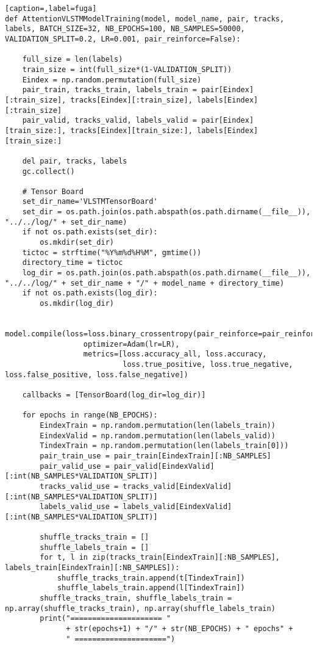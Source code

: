 \begin{lstlisting}[caption=,label=fuga]
def AttentionVLSTMModelTraining(model, model_name, pair, tracks, labels, BATCH_SIZE=32, NB_EPOCHS=100, NB_SAMPLES=50000, VALIDATION_SPLIT=0.2, LR=0.001, pair_reinforce=False):

    full_size = len(labels)
    train_size = int(full_size*(1-VALIDATION_SPLIT))
    Eindex = np.random.permutation(full_size)
    pair_train, tracks_train, labels_train = pair[Eindex][:train_size], tracks[Eindex][:train_size], labels[Eindex][:train_size]
    pair_valid, tracks_valid, labels_valid = pair[Eindex][train_size:], tracks[Eindex][train_size:], labels[Eindex][train_size:]

    del pair, tracks, labels
    gc.collect()

    # Tensor Board
    set_dir_name='VLSTMTensorBoard'
    set_dir = os.path.join(os.path.abspath(os.path.dirname(__file__)), "../../log/" + set_dir_name)
    if not os.path.exists(set_dir):
        os.mkdir(set_dir)
    tictoc = strftime("%Y%m%d%H%M", gmtime())
    directory_time = tictoc
    log_dir = os.path.join(os.path.abspath(os.path.dirname(__file__)), "../../log/" + set_dir_name + "/" + model_name + directory_time)
    if not os.path.exists(log_dir):
        os.mkdir(log_dir)

    model.compile(loss=loss.binary_crossentropy(pair_reinforce=pair_reinforce),
                  optimizer=Adam(lr=LR),
                  metrics=[loss.accuracy_all, loss.accuracy,
                           loss.true_positive, loss.true_negative, loss.false_positive, loss.false_negative])

    callbacks = [TensorBoard(log_dir=log_dir)]

    for epochs in range(NB_EPOCHS):
        EindexTrain = np.random.permutation(len(labels_train))
        EindexValid = np.random.permutation(len(labels_valid))
        TindexTrain = np.random.permutation(len(labels_train[0]))
        pair_train_use = pair_train[EindexTrain][:NB_SAMPLES]
        pair_valid_use = pair_valid[EindexValid][:int(NB_SAMPLES*VALIDATION_SPLIT)]
        tracks_valid_use = tracks_valid[EindexValid][:int(NB_SAMPLES*VALIDATION_SPLIT)]
        labels_valid_use = labels_valid[EindexValid][:int(NB_SAMPLES*VALIDATION_SPLIT)]

        shuffle_tracks_train = []
        shuffle_labels_train = []
        for t, l in zip(tracks_train[EindexTrain][:NB_SAMPLES], labels_train[EindexTrain][:NB_SAMPLES]):
            shuffle_tracks_train.append(t[TindexTrain])
            shuffle_labels_train.append(l[TindexTrain])
        shuffle_tracks_train, shuffle_labels_train = np.array(shuffle_tracks_train), np.array(shuffle_labels_train)
        print("===================== "
              + str(epochs+1) + "/" + str(NB_EPOCHS) + " epochs" +
              " =====================")


\end{lstlisting}
